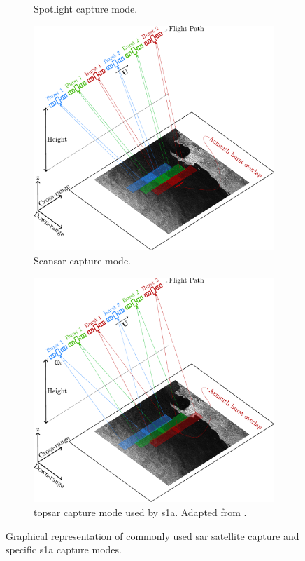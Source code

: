 \begin{figure} [htbp]
\begin{subfigure}{0.48\textwidth}
        \caption{Spotlight capture mode.}
        \label{fig:theory.spotlight}
    \end{subfigure} 
    \begin{subfigure}{0.48\textwidth}
        \includegraphics[width=\textwidth]{Figures/Theory/scanSAR.pdf}
        \caption{Scan\acs{sar} capture mode.}
        \label{fig:theory.scanSAR}
    \end{subfigure} 
    \begin{subfigure}{0.48\textwidth}
        \includegraphics[width=\textwidth]{Figures/Theory/tops.pdf}
        \caption{\acs{topsar} capture mode used by \acs{s1a}. Adapted from \cite{Huang2014}.}
        \label{fig:theory.tops}
    \end{subfigure}     
    \caption{Graphical representation of commonly used \acs{sar} satellite capture and specific \acs{s1a} capture modes.}
    \label{fig:theory.sarCaptureModes}
\end{figure}

